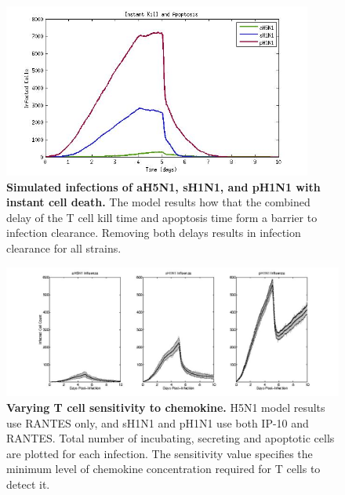 \documentclass[10pt]{article}
\begin{document}
\begin{figure}[!ht]
\begin{center}
\includegraphics[width=4in]{Figure_7}
 \end{center}
\caption{{\bf Simulated infections of aH5N1, sH1N1, and pH1N1 with instant cell death.} The model results how that the combined delay of the T cell kill time and apoptosis time form a barrier to infection clearance.  Removing both delays results in infection clearance for all strains.}
 \label{fig:instantkill}
\end{figure}

\setcounter{figure}{0}
\renewcommand{\thefigure}{S\arabic{figure}}

\begin{figure}[ht!]
\begin{center}
\includegraphics[width=\textwidth]{Figure_S1}
 \end{center}
\caption{{\bf Varying T cell sensitivity to chemokine.}  H5N1 model results use RANTES  only, and sH1N1 and pH1N1 use both IP-10 and RANTES. Total number of incubating, secreting and apoptotic cells are plotted for each infection.  The sensitivity value specifies the minimum level of chemokine concentration required for T cells to detect it.} 
\end{figure}
\end{document}
